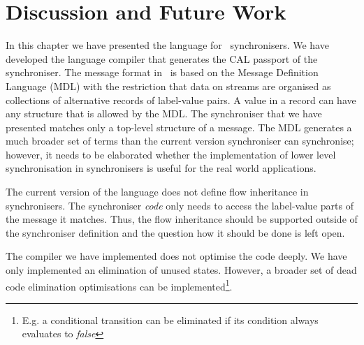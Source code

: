 \section{Discussion and Future Work}
In this chapter we have presented the language for \ak\ synchronisers. We have developed the language compiler that generates the CAL passport of the synchroniser. The message format in \ak\ is based on the Message Definition Language (MDL) with the restriction that data on streams are organised as collections of alternative records of label-value pairs. A value in a record can have any structure that is allowed by the MDL. The synchroniser that we have presented matches only a top-level structure of a message. The MDL generates a much broader set of terms than the current version synchroniser can synchronise; however, it needs to be elaborated whether the implementation of lower level synchronisation in synchronisers is useful for the real world applications.

The current version of the language does not define flow inheritance in synchronisers. The synchroniser \emph{code} only needs to access the label-value parts of the message it matches. Thus, the flow inheritance should be supported outside of the synchroniser definition and the question how it should be done is left open.

The compiler we have implemented does not optimise the code deeply. We have only implemented an elimination of unused states. However, a broader set of dead code elimination optimisations can be implemented\footnote{E.g. a conditional transition can be eliminated if its condition always evaluates to \emph{false}}.

